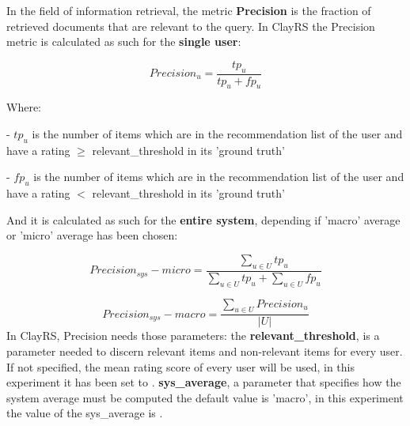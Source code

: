 \documentclass[12pt, a4paper]{article}
\begin{document}


In the field of information retrieval, the metric \textbf{Precision} is the fraction
of retrieved documents that are relevant to the query.
\hfill\break
In ClayRS the Precision metric is calculated as such for the \textbf{single user}:

    \[
    Precision_u = \frac{tp_u}{tp_u + fp_u}
    \]

    Where:

    - $tp_u$ is the number of items which are in the recommendation list of the user and have a
      rating $\geq$ relevant\_threshold in its 'ground truth'

    - $fp_u$ is the number of items which are in the recommendation list of the user and have a
      rating $<$ relevant\_threshold in its 'ground truth'
    \hfill\break


    And it is calculated as such for the \textbf{entire system}, depending if 'macro' average or 'micro' average has been
    chosen:

    \[
    Precision_{sys} - micro = \frac{\sum_{u \in U} tp_u}{\sum_{u \in U} tp_u + \sum_{u \in U} fp_u}
    \]


    \[
    Precision_{sys} - macro = \frac{\sum_{u \in U} Precision_u}{|U|}
    \]
In ClayRS, Precision needs those parameters:
\hfill\break
the \textbf{relevant\_threshold}, is a parameter needed to discern relevant items and non-relevant items for every user.
If not specified, the mean rating score of every user will be used, in this experiment it has been set to
\textbf{}.
\hfill\break\hfill\break
\textbf{sys\_average}, a parameter that specifies how the system average must be computed the default value is 'macro',
in this experiment the value of the sys\_average is \textbf{}.
\end{document}

